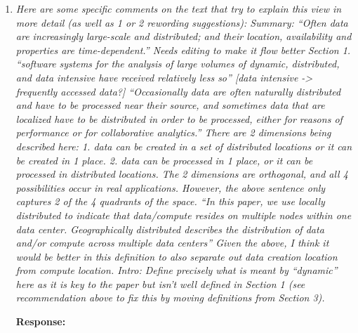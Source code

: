 \documentclass{article}
\begin{document}
\begin{enumerate}
\item  \emph{Here are some specific comments on the text that try to explain this view in more detail (as well as 1 or 2 rewording suggestions): Summary: “Often data are increasingly large-scale and distributed; and their location, availability and properties are time-dependent.” Needs editing to make it flow better Section 1. “software systems for the analysis of large volumes of dynamic, distributed, and data intensive have received relatively less so” [data intensive -> frequently accessed data?] “Occasionally data are often naturally distributed and have to be processed near their source, and sometimes data that are localized have to be distributed in order to be processed, either for reasons of performance or for collaborative analytics.” There are 2 dimensions being described here: 1. data can be created in a set of distributed locations or it can be created in 1 place. 2. data can be processed in 1 place, or it can be processed in distributed locations. The 2 dimensions are orthogonal, and all 4 possibilities occur in real applications. However, the above sentence only captures 2 of the 4 quadrants of the space. “In this paper, we use locally distributed to indicate that data/compute resides on multiple nodes within one data center. Geographically distributed describes the distribution of data and/or compute across multiple data centers” Given the above, I think it would be better in this definition to also separate out data creation location from compute location. Intro: Define precisely what is meant by “dynamic” here as it is key to the paper but isn’t well defined in Section 1 (see recommendation above to fix this by moving definitions from Section 3).}

\textbf{Response:} 


\end{enumerate}
\end{document}
